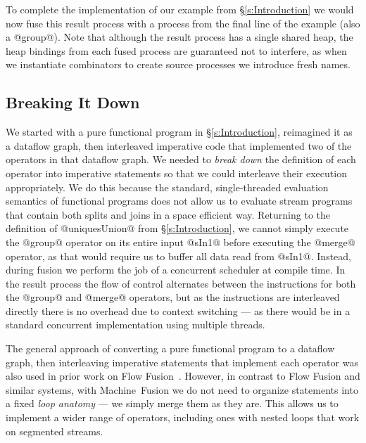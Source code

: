 To complete the implementation of our example from \S\ref{s:Introduction} we would now fuse this result process with a process from the final line of the example (also a @group@). Note that although the result process has a single shared heap, the heap bindings from each fused process are guaranteed not to interfere, as when we instantiate combinators to create source processes we introduce fresh names. 


\subsection{Breaking It Down}
We started with a pure functional program in \S\ref{s:Introduction}, reimagined it as a dataflow graph, then interleaved imperative code that implemented two of the operators in that dataflow graph. We needed to \emph{break down} the definition of each operator into imperative statements so that we could interleave their execution appropriately. We do this because the standard, single-threaded evaluation semantics of functional programs does not allow us to evaluate stream programs that contain both splits and joins in a space efficient way. Returning to the definition of @uniquesUnion@ from \S\ref{s:Introduction}, we cannot simply execute the @group@ operator on its entire input @sIn1@ before executing the @merge@ operator, as that would require us to buffer all data read from @sIn1@. Instead, during fusion we perform the job of a concurrent scheduler at compile time. In the result process the flow of control alternates between the instructions for both the @group@ and @merge@ operators, but as the instructions are interleaved directly there is no overhead due to context switching --- as there would be in a standard concurrent implementation using multiple threads.

The general approach of converting a pure functional program to a dataflow graph, then interleaving imperative statements that implement each operator was also used in prior work on Flow Fusion~\cite{lippmeier2013data}. However, in contrast to Flow Fusion and similar systems, with \mbox{Machine Fusion} we do not need to organize statements into a fixed \emph{loop anatomy} --- we simply merge them as they are. This allows us to implement a wider range of operators, including ones with nested loops that work on segmented streams.

